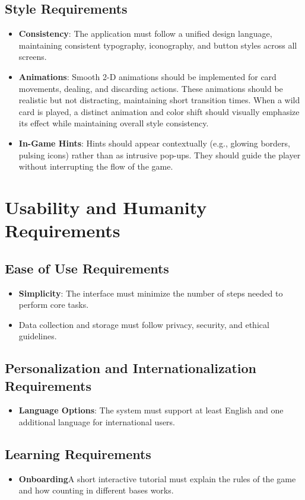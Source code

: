 \documentclass[12pt]{article}
\begin{document}
\subsection{Style Requirements}
	\begin{itemize}
		\item \textbf{Consistency}: The application must follow a unified design language, maintaining consistent typography, iconography, and button styles across all screens.
		\item \textbf{Animations}: Smooth 2-D animations should be implemented for card movements, dealing, and discarding actions. These animations should be realistic but not distracting, maintaining short transition times. When a wild card is played, a distinct animation and color shift should visually emphasize its effect while maintaining overall style consistency.
		\item \textbf{In-Game Hints}: Hints should appear contextually (e.g., glowing borders, pulsing icons) rather than as intrusive pop-ups. They should guide the player without interrupting the flow of the game.
		
	\end{itemize}

\section{Usability and Humanity Requirements}
\subsection{Ease of Use Requirements}
	\begin{itemize}
		\item \textbf{Simplicity}: The interface must minimize the number of steps needed to perform core tasks.
		\item Data collection and storage must follow privacy, security, and ethical guidelines.
	\end{itemize}
\subsection{Personalization and Internationalization Requirements}
	\begin{itemize}
		\item \textbf{Language Options}: The system must support at least English and one additional language for international users.
	\end{itemize}
\subsection{Learning Requirements}
	\begin{itemize}
		\item \textbf{Onboarding}A short interactive tutorial must explain the rules of the game and how counting in different bases works.
	\end{itemize}
\end{document}
